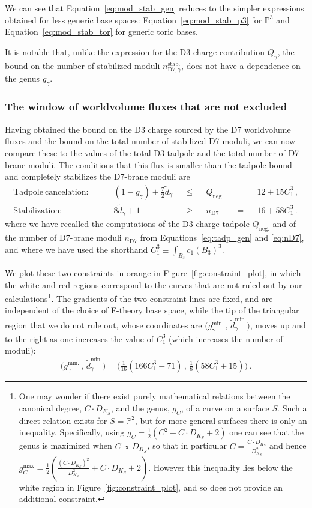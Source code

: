 \documentclass[a4paper,12pt]{article}
\numberwithin{equation}{section}
\newcommand{\mbb}{\mathbb}
\newcommand{\be}{\begin{equation}}
\newcommand{\ee}{\end{equation}}
\newcommand{\fref}[1]{Figure~\ref{#1}}
\newcommand{\fthb}{B_3}				%
\newcommand{\cand}[1]{D_{K_{#1}}}		%
\newcommand{\crv}{\gamma}			%
\newcommand{\degr}[1]{\tilde{d}_{#1}}			%
\newcommand{\flxcont}[1]{Q_{#1}}		%
\newcommand{\stbmod}[1]{n_{\mathrm{D7},{#1}}^\mathrm{stab.}}		%
\begin{document}
We can see that Equation~\eqref{eq:mod_stab_gen} reduces to the simpler expressions obtained for less generic base spaces:  Equation~\eqref{eq:mod_stab_p3} for ${\mathbb P}^3$ and Equation~\eqref{eq:mod_stab_tor} for generic toric bases. 

It is notable that, unlike the expression for the D3 charge contribution $\flxcont{\crv}$, the bound on the number of stabilized moduli  $\stbmod{\crv}$, does not have a dependence on the genus $g_\crv$.

\subsubsection*{The window of worldvolume fluxes that are not excluded}
\label{sec:window}

Having obtained the bound on the D3 charge sourced by the D7 worldvolume fluxes and the bound on the total number of stabilized D7 moduli, we can now compare these to the values of the total D3 tadpole and the total number of D7-brane moduli. The conditions that this flux is smaller than the tadpole bound and completely stabilizes the D7-brane moduli are
\be
\begin{aligned}
\mathrm{Tadpole~cancelation:}~&~ &&(1-g_\crv) + \tfrac72 \degr{\crv} && \leq && Q_\mathrm{neg.} && = && 12 + 15C_1^3 \,, \\
\mathrm{Stabilization:}~&~ && 8\degr{\crv} + 1 && \geq && n_{\mathrm{D}7} && = && 16 + 58C_1^3 \,.
\end{aligned}
\label{eq:constraints}
\ee
where we have recalled the computations of the D3 charge tadpole $Q_\mathrm{neg.}$ and of the number of D7-brane moduli $n_{\mathrm{D}7}$ from Equations~\eqref{eq:tadp_gen} and \eqref{eq:nD7}, and where we have used the shorthand $C_1^3 \equiv \int_{\fthb}c_1(\fthb)^3$.

We plot these two constraints in orange in \fref{fig:constraint_plot}, in which the white and red regions correspond to the curves that are not ruled out by our calculations\footnote{One may wonder if there exist purely mathematical relations between the canonical degree, $C \cdot \cand{S}$, and the genus, $g_C$, of a curve on a surface $S$. Such a direct relation exists for $S = \mbb{P}^2$, but for more general surfaces there is only an inequality. Specifically, using $g_C = \frac{1}{2}(C^2 + C \cdot \cand{S} +2)$ one can see that the genus is maximized when $C \propto \cand{S}$, so that in particular $C = \frac{C \cdot \cand{S}}{\cand{S}^2}$ and hence $g_C^\mathrm{max} = \frac{1}{2}\left(\frac{(C \cdot \cand{S})^2}{\cand{S}^2}+C \cdot \cand{S} + 2 \right)$. However this inequality lies below the white region in \fref{fig:constraint_plot}, and so does not provide an additional constraint.}. The gradients of the two constraint lines are fixed, and are independent of the choice of F-theory base space, while the tip of the triangular region that we do not rule out, whose coordinates are $\big( g_\crv^\mathrm{min.} \,,\, \degr{\crv}^\mathrm{min.} \big) $, moves up and to the right as one increases the value of $C_1^3$ (which increases the number of moduli):
\be
\big( g_\crv^\mathrm{min.} \,,\, \degr{\crv}^\mathrm{min.} \big) = \Big( \tfrac{1}{16}(166C_1^3-71) \,,\, \tfrac{1}{8}(58C_1^3+15) \Big) \,.
\label{eq:min_g_and_d}
\ee
\end{document}
